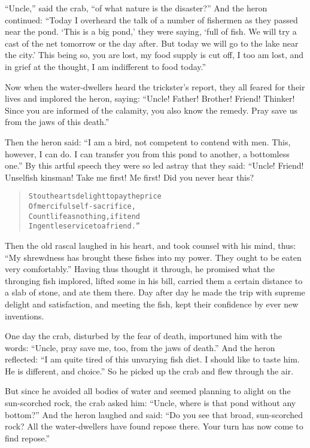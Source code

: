 \documentclass[article, twoside, 14pt]{memoir}
\renewenvironment{verbatim}{%
\begin{quote}%
\vskip -10pt%
\begin{alltt}\normalfont\large}{\end{alltt}%
\end{quote}%
\vskip -10pt
} %
\begin{document}
``Uncle,'' said the crab, ``of what nature is the disaster?'' And
the heron continued:
``Today I overheard the talk of a number of fishermen as they passed near the pond. `This is a big pond,' they were saying, `full of fish. We will try a cast of the net tomorrow or the day after. But today we will go to the lake near the city.' This being so, you are lost, my food supply is cut off, I too am lost, and in grief at the thought, I am indifferent to food today.''

Now when the water-dwellers heard the trickster's report, they all
feared for their lives and implored the heron, saying:
``Uncle! Father! Brother! Friend! Thinker! Since you are informed of the calamity, you also know the remedy. Pray save us from the jaws of this death.''

Then the heron said:
``I am a bird, not competent to contend with men. This, however, I can do. I can transfer you from this pond to another, a bottomless one.''
By this artful speech they were so led astray that they said:
“Uncle! Friend! Unselfish kinsman! Take me first! Me first! Did you
never hear this?

\begin{verbatim}
Stout hearts delight to pay the price
Of merciful self-sacrifice,
Count life as nothing, if it end
In gentle service to a friend.”
\end{verbatim}
Then the old rascal laughed in his heart, and took counsel with his
mind, thus:
``My shrewdness has brought these fishes into my power. They ought to be eaten very comfortably.''
Having thus thought it through, he promised what the thronging fish
implored, lifted some in his bill, carried them a certain
distance to a slab of stone, and ate them there. Day after day he
made the trip with supreme delight and satisfaction, and meeting
the fish, kept their confidence by ever new inventions.

One day the crab, disturbed by the fear of death, importuned him
with the words:
``Uncle, pray save me, too, from the jaws of death.'' And the heron
reflected:
``I am quite tired of this unvarying fish diet. I should like to taste him. He is different, and choice.''
So he picked up the crab and flew through the air.

But since he avoided all bodies of water and seemed planning to
alight on the sun-scorched rock, the crab asked him:
``Uncle, where is that pond without any bottom?'' And the heron
laughed and said:
``Do you see that broad, sun-scorched rock? All the water-dwellers have found repose there. Your turn has now come to find repose.''
\end{document}
